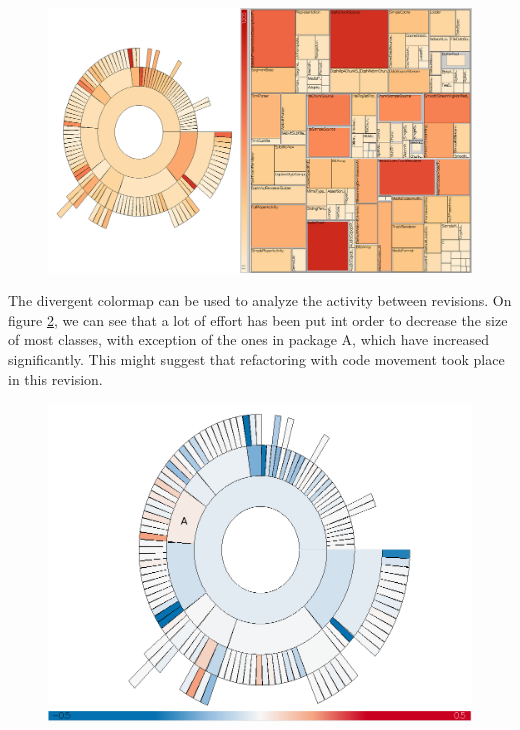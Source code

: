 \begin{figure}[H]
  \centering
  \includegraphics[width=1\textwidth]{figures/colormap_hier.png}
  \caption{}
  \label{fig:colormap_hier}
\end{figure}

The divergent colormap can be used to analyze the activity between revisions. On figure \ref{fig:colormap_div_sun}, we can see that a lot of effort has been put int order to decrease the size of most classes, with exception of the ones in package A, which have increased significantly. This might suggest that refactoring with code movement took place in this revision.

\begin{figure}[H]
  \centering
  \includegraphics[width=1.0\textwidth]{figures/colormap_div_sun.png}
  \caption{}
  \label{fig:colormap_div_sun}
\end{figure}
